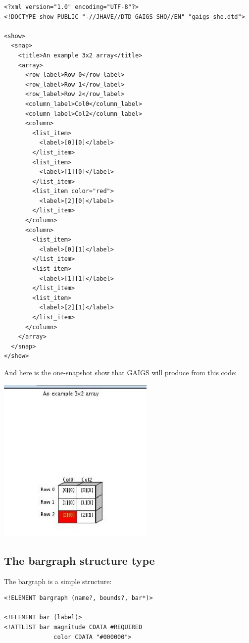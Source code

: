 \documentclass[11pt,letterpaper]{book}
\begin{document}
\footnotesize \begin{verbatim}
<?xml version="1.0" encoding="UTF-8"?>
<!DOCTYPE show PUBLIC "-//JHAVE//DTD GAIGS SHO//EN" "gaigs_sho.dtd">

<show>
  <snap>
    <title>An example 3x2 array</title>
    <array>
      <row_label>Row 0</row_label>
      <row_label>Row 1</row_label>
      <row_label>Row 2</row_label>
      <column_label>Col0</column_label>
      <column_label>Col2</column_label>
      <column>
        <list_item>
          <label>[0][0]</label>
        </list_item>
        <list_item>
          <label>[1][0]</label>
        </list_item>
        <list_item color="red">
          <label>[2][0]</label>
        </list_item>
      </column>
      <column>
        <list_item>
          <label>[0][1]</label>
        </list_item>
        <list_item>
          <label>[1][1]</label>
        </list_item>
        <list_item>
          <label>[2][1]</label>
        </list_item>
      </column>
    </array>
  </snap>
</show>
\end{verbatim} \normalsize

And here is the one-snapshot show that GAIGS will produce from this code:


\begin{center}
  \includegraphics[width=3in]{howto_graphics/array.eps}
\end{center}


\subsection{The bargraph structure type}


The bargraph is a simple structure:

\footnotesize 
\begin{verbatim}
<!ELEMENT bargraph (name?, bounds?, bar*)>

<!ELEMENT bar (label)>
<!ATTLIST bar magnitude CDATA #REQUIRED
              color CDATA "#000000">
\end{verbatim}
\normalsize
  
\end{document}
